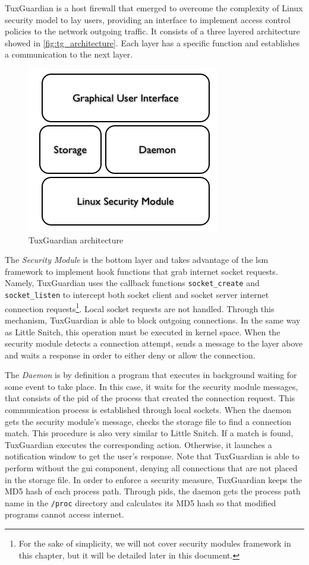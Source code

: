 TuxGuardian is a host firewall that emerged to overcome the complexity of Linux security model to lay users, providing an interface to implement access control policies to the network outgoing traffic. It consists of a three layered architecture showed in \autoref{fig:tg_architecture}. Each layer has a specific function and establishes a communication to the next layer. 

\begin{figure}[htbp]
 \centering
 \includegraphics[scale=0.5]{figures/tg_arch.png}
 \caption{TuxGuardian architecture}
 \label{fig:tg_architecture}
\end{figure}

The \textit{Security Module} is the bottom layer and takes advantage of the \gls{lsm} framework  to implement hook functions that grab internet socket requests. Namely, TuxGuardian uses the callback functions \texttt{socket\_create} and \texttt{socket\_listen} to intercept both socket client and socket server internet connection requests\footnote{For the sake of simplicity, we will not cover security modules framework in this chapter, but it will be detailed later in this document.}. Local socket requests are not handled. Through this mechanism, TuxGuardian is able to block outgoing connections. In the same way as Little Snitch, this operation must be executed in kernel space. When the security module detects a connection attempt, sends a message to the layer above and waits a response in order to either deny or allow the connection.

The \textit{Daemon} is by definition a program that executes in background waiting for some event to take place. In this case, it waits for the security module messages, that consists of the \gls{pid} of the process that created the connection request. This communication process is established through local sockets. When the daemon gets the security module's message, checks the storage file to find a connection match. This procedure is also very similar to Little Snitch. If a match is found, TuxGuardian executes the corresponding action. Otherwise, it launches a notification window to get the user's response. Note that TuxGuardian is able to perform without the \gls{gui} component, denying all connections that are not placed in the storage file. In order to enforce a security measure, TuxGuardian keeps the MD5 hash of each process path. Through \gls{pid}s, the daemon gets the process path name in the \texttt{/proc} directory and calculates its MD5 hash so that modified programs cannot access internet.

